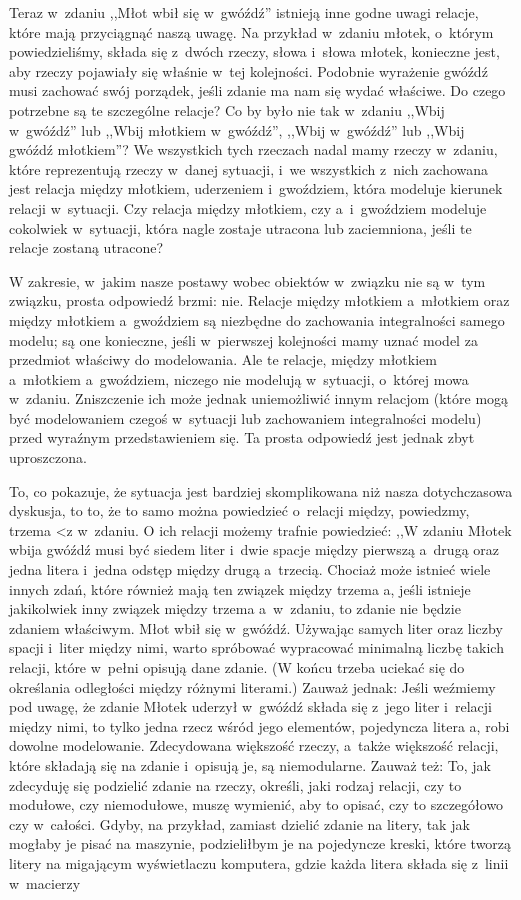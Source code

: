 \documentclass[oneside,polish,11pt,rmheadings]{mwbk}
\begin{document}
Teraz w~zdaniu ,,Młot wbił się w~gwóźdź'' istnieją inne godne uwagi relacje, które mają przyciągnąć naszą uwagę. Na przykład w~zdaniu młotek, o~którym powiedzieliśmy, składa się z~dwóch rzeczy, słowa i~słowa młotek, konieczne jest, aby rzeczy pojawiały się właśnie w~tej kolejności. Podobnie wyrażenie gwóźdź musi zachować swój porządek, jeśli zdanie ma nam się wydać właściwe. Do czego potrzebne są te szczególne relacje? Co by było nie tak w~zdaniu ,,Wbij w~gwóźdź'' lub ,,Wbij młotkiem w~gwóźdź'', ,,Wbij w~gwóźdź'' lub ,,Wbij gwóźdź młotkiem''? We wszystkich tych rzeczach nadal mamy rzeczy w~zdaniu, które reprezentują rzeczy w~danej sytuacji, i~we wszystkich z~nich zachowana jest relacja między młotkiem, uderzeniem i~gwoździem, która modeluje kierunek relacji w~sytuacji. Czy relacja między młotkiem, czy a~i~gwoździem modeluje cokolwiek w~sytuacji, która nagle zostaje utracona lub zaciemniona, jeśli te relacje zostaną utracone? 

W zakresie, w~jakim nasze postawy wobec obiektów w~związku nie są w~tym związku, prosta odpowiedź brzmi: nie. Relacje między młotkiem a~młotkiem oraz między młotkiem a~gwoździem są niezbędne do zachowania integralności samego modelu; są one konieczne, jeśli w~pierwszej kolejności mamy uznać model za przedmiot właściwy do modelowania. Ale te relacje, między młotkiem a~młotkiem a~gwoździem, niczego nie modelują w~sytuacji, o~której mowa w~zdaniu. Zniszczenie ich może jednak uniemożliwić innym relacjom (które mogą być modelowaniem czegoś w~sytuacji lub zachowaniem integralności modelu) przed wyraźnym przedstawieniem się. Ta prosta odpowiedź jest jednak zbyt uproszczona. 

To, co pokazuje, że sytuacja jest bardziej skomplikowana niż nasza dotychczasowa dyskusja, to to, że to samo można powiedzieć o~relacji między, powiedzmy, trzema {\textless}z w~zdaniu. O ich relacji możemy trafnie powiedzieć: ,,W zdaniu Młotek wbija gwóźdź musi być siedem liter i~dwie spacje między pierwszą a~drugą oraz jedna litera i~jedna odstęp między drugą a~trzecią. Chociaż może istnieć wiele innych zdań, które również mają ten związek między trzema a, jeśli istnieje jakikolwiek inny związek między trzema a~w~zdaniu, to zdanie nie będzie zdaniem właściwym. Młot wbił się w~gwóźdź. Używając samych liter oraz liczby spacji i~liter między nimi, warto spróbować wypracować minimalną liczbę takich relacji, które w~pełni opisują dane zdanie. (W końcu trzeba uciekać się do określania odległości między różnymi literami.) Zauważ jednak: Jeśli weźmiemy pod uwagę, że zdanie Młotek uderzył w~gwóźdź składa się z~jego liter i~relacji między nimi, to tylko jedna rzecz wśród jego elementów, pojedyncza litera a, robi dowolne modelowanie. Zdecydowana większość rzeczy, a~także większość relacji, które składają się na zdanie i~opisują je, są niemodularne. Zauważ też: To, jak zdecyduję się podzielić zdanie na rzeczy, określi, jaki rodzaj relacji, czy to modułowe, czy niemodułowe, muszę wymienić, aby to opisać, czy to szczegółowo czy w~całości. Gdyby, na przykład, zamiast dzielić zdanie na litery, tak jak mogłaby je pisać na maszynie, podzieliłbym je na pojedyncze kreski, które tworzą litery na migającym wyświetlaczu komputera, gdzie każda litera składa się z~linii w~macierzy 
\end{document}

